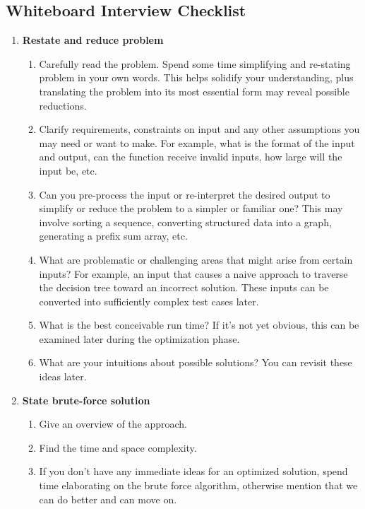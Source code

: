 \documentclass{article}
\begin{document}
\subsection{Whiteboard Interview Checklist}
\begin{enumerate}
    \item  \textbf{Restate and reduce problem}
    \begin{enumerate}
        \item Carefully read the problem. Spend some time simplifying and re-stating problem in your own words. This helps solidify your understanding, plus translating the problem into its most essential form may reveal possible reductions.
        \item Clarify requirements, constraints on input and any other assumptions you may need or want to make. For example, what is the format of the input and output, can the function receive invalid inputs, how large will the input be, etc.
        \item Can you pre-process the input or re-interpret the desired output to simplify or reduce the problem to a simpler or familiar one? This may involve sorting a sequence, converting structured data into a graph, generating a prefix sum array, etc.
        \item What are problematic or challenging areas that might arise from certain inputs? For example, an input that causes a naive approach to traverse the decision tree toward an incorrect solution. These inputs can be converted into sufficiently complex test cases later.
        \item What is the best conceivable run time? If it's not yet obvious, this can be examined later during the optimization phase.
        \item What are your intuitions about possible solutions? You can revisit these ideas later.
    \end{enumerate}
    
    \item \textbf{State brute-force solution}
    \begin{enumerate}
        \item Give an overview of the approach.
        \item Find the time and space complexity.
        \item If you don't have any immediate ideas for an optimized solution, spend time elaborating on the brute force algorithm, otherwise mention that we can do better and can move on.
    \end{enumerate}
    

\end{enumerate}
\end{document}
